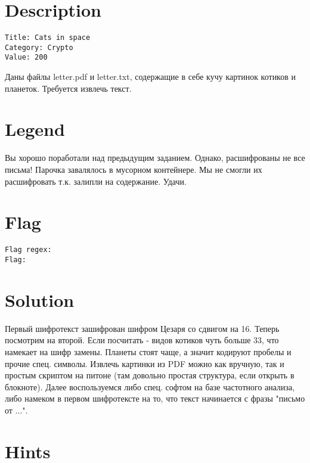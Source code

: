 \documentclass{article}
\begin{document}
	
	\renewcommand{\contentsname}{Contents}
	
	\section{Description}
	
	\tt Title: Cats in space \\
	
	\tt Category: Crypto \\
	
	\tt Value: 200
	
	\begin{framed}
		Даны файлы letter.pdf и letter.txt, содержащие в себе кучу картинок котиков и планеток. Требуется извлечь текст.
	\end{framed}
	
	\section{Legend}
	
	Вы хорошо поработали над предыдущим заданием. Однако, расшифрованы не все письма! Парочка завалялось в мусорном контейнере. Мы не смогли их расшифровать т.к. залипли на содержание. Удачи.
	
	\section{Flag}
	
	\tt Flag regex: 
	 \\
	
	\tt Flag: 
	
	\section{Solution}
	
	Первый шифротекст зашифрован шифром Цезаря со сдвигом на 16. Теперь посмотрим на второй. Если посчитать - видов котиков чуть больше 33, что намекает на шифр замены. Планеты стоят чаще, а значит кодируют пробелы и прочие спец. символы. Извлечь картинки из PDF можно как вручную, так и простым скриптом на питоне (там довольно простая структура, если открыть в блокноте). Далее воспользуемся либо спец. софтом на базе частотного анализа, либо намеком в первом шифротексте на то, что текст начинается с фразы "письмо от ...".
	
	\section{Hints}
	
\end{document}
